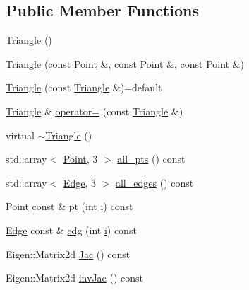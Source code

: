 \subsection*{Public Member Functions}
\begin{DoxyCompactItemize}
\item 
\hyperlink{classTspeed_1_1Geo_1_1Triangle_a96ea06e6dbd9b707184c5e22d305e6e6}{Triangle} ()
\item 
\hyperlink{classTspeed_1_1Geo_1_1Triangle_a30f712bbedbf84ef114de38c04c7b274}{Triangle} (const \hyperlink{classTspeed_1_1Geo_1_1Point}{Point} \&, const \hyperlink{classTspeed_1_1Geo_1_1Point}{Point} \&, const \hyperlink{classTspeed_1_1Geo_1_1Point}{Point} \&)
\item 
\hyperlink{classTspeed_1_1Geo_1_1Triangle_a3688a8a85846b3262366267d85e80d5a}{Triangle} (const \hyperlink{classTspeed_1_1Geo_1_1Triangle}{Triangle} \&)=default
\item 
\hyperlink{classTspeed_1_1Geo_1_1Triangle}{Triangle} \& \hyperlink{classTspeed_1_1Geo_1_1Triangle_a38b03bcff96b6ed334d381d56507c91d}{operator=} (const \hyperlink{classTspeed_1_1Geo_1_1Triangle}{Triangle} \&)
\item 
virtual \hyperlink{classTspeed_1_1Geo_1_1Triangle_af195c8c8c367a11fa9dc95f4a4ef8898}{$\sim$\-Triangle} ()
\item 
std\-::array$<$ \hyperlink{classTspeed_1_1Geo_1_1Point}{Point}, 3 $>$ \hyperlink{classTspeed_1_1Geo_1_1Triangle_a5749a0b4d9cec7c73fdfa13904ab04c6}{all\-\_\-pts} () const 
\item 
std\-::array$<$ \hyperlink{classTspeed_1_1Geo_1_1Edge}{Edge}, 3 $>$ \hyperlink{classTspeed_1_1Geo_1_1Triangle_a95aad39ebd133e7fc23fd6a2431c601e}{all\-\_\-edges} () const 
\item 
\hyperlink{classTspeed_1_1Geo_1_1Point}{Point} const \& \hyperlink{classTspeed_1_1Geo_1_1Triangle_a6c4b1ba6d7adf584776089ecfc8d4f8e}{pt} (int \hyperlink{vtk__vector__out_8m_a6f6ccfcf58b31cb6412107d9d5281426}{i}) const 
\item 
\hyperlink{classTspeed_1_1Geo_1_1Edge}{Edge} const \& \hyperlink{classTspeed_1_1Geo_1_1Triangle_aabfd53348c1c63905abf4eeda9cd42ae}{edg} (int \hyperlink{vtk__vector__out_8m_a6f6ccfcf58b31cb6412107d9d5281426}{i}) const 
\item 
Eigen\-::\-Matrix2d \hyperlink{classTspeed_1_1Geo_1_1Triangle_a936a5210cb5fdc598fa55a703b0d776d}{Jac} () const 
\item 
Eigen\-::\-Matrix2d \hyperlink{classTspeed_1_1Geo_1_1Triangle_acadcc4f5328209374fa1060e42d564bb}{inv\-Jac} () const 

\end{DoxyCompactItemize}

